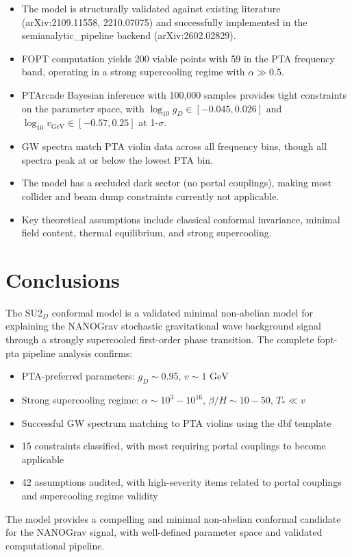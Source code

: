 \documentclass[11pt,a4paper,oneside]{article}
\begin{document}
\begin{itemize}
\item The model is structurally validated against existing literature (arXiv:2109.11558, 2210.07075) and successfully implemented in the semianalytic{\_}pipeline backend (arXiv:2602.02829).
\item FOPT computation yields 200 viable points with 59 in the PTA frequency band, operating in a strong supercooling regime with $\alpha \gg 0.5$.
\item PTArcade Bayesian inference with 100,000 samples provides tight constraints on the parameter space, with $\log_{10} g_D \in [-0.045, 0.026]$ and $\log_{10} v_{\text{GeV}} \in [-0.57, 0.25]$ at 1-$\sigma$.
\item GW spectra match PTA violin data across all frequency bins, though all spectra peak at or below the lowest PTA bin.
\item The model has a secluded dark sector (no portal couplings), making most collider and beam dump constraints currently not applicable.
\item Key theoretical assumptions include classical conformal invariance, minimal field content, thermal equilibrium, and strong supercooling.
\end{itemize}

\section{Conclusions}
\label{sec:conclusions}

The SU2$_D$ conformal model is a validated minimal non-abelian model for explaining the NANOGrav stochastic gravitational wave background signal through a strongly supercooled first-order phase transition. The complete fopt-pta pipeline analysis confirms:

\begin{itemize}
\item PTA-preferred parameters: $g_D \sim 0.95$, $v \sim 1 \text{ GeV}$
\item Strong supercooling regime: $\alpha \sim 10^3{-}10^{16}$, $\beta/H \sim 10{-}50$, $T_* \ll v$
\item Successful GW spectrum matching to PTA violins using the dbf template
\item 15 constraints classified, with most requiring portal couplings to become applicable
\item 42 assumptions audited, with high-severity items related to portal couplings and supercooling regime validity
\end{itemize}

The model provides a compelling and minimal non-abelian conformal candidate for the NANOGrav signal, with well-defined parameter space and validated computational pipeline.
\end{document}

